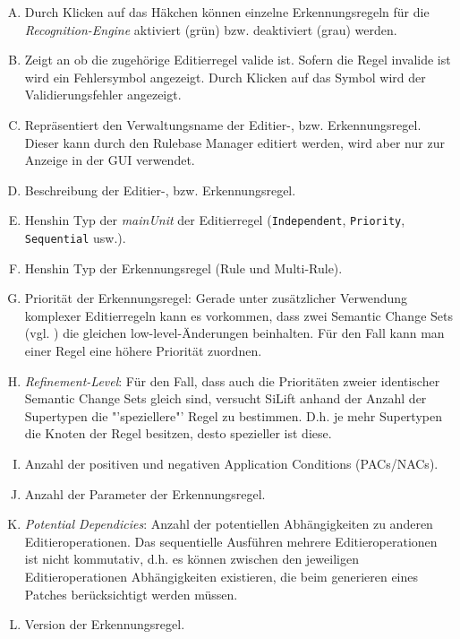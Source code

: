 \begin{enumerate}[(A)]
\item Durch Klicken auf das Häkchen können einzelne Erkennungsregeln für die \textit{Recognition-Engine} aktiviert (grün) bzw. deaktiviert (grau) werden.

\item Zeigt an ob die zugehörige Editierregel valide ist. Sofern die Regel invalide ist wird ein Fehlersymbol angezeigt. Durch Klicken auf das Symbol wird der Validierungsfehler angezeigt.

\item Repräsentiert den Verwaltungsname der Editier-, bzw. Erkennungsregel. Dieser kann durch den Rulebase Manager editiert werden, wird aber nur zur Anzeige in der GUI verwendet.

\item Beschreibung der Editier-, bzw. Erkennungsregel.

\item Henshin Typ der \textit{mainUnit} der Editierregel (\texttt{Independent}, \texttt{Priority}, \texttt{Sequential} usw.).

\item Henshin Typ der Erkennungsregel (Rule und Multi-Rule).

\item Priorität der Erkennungsregel:
 Gerade unter zusätzlicher Verwendung komplexer Editierregeln kann es vorkommen, dass zwei Semantic Change Sets (vgl. \pageref{page:semantic_change_sets}) die gleichen low-level-Änderungen beinhalten. 
Für den Fall kann man einer Regel eine höhere Priorität zuordnen. 

\item \textit{Refinement-Level}: 
Für den Fall, dass auch die Prioritäten zweier identischer Semantic Change Sets gleich sind, versucht SiLift anhand der Anzahl der Supertypen die "'speziellere"' Regel zu bestimmen. 
D.h. je mehr Supertypen die Knoten der Regel besitzen, desto spezieller ist diese. 

\item Anzahl der positiven und negativen Application Conditions (PACs/NACs).

\item Anzahl der Parameter der Erkennungsregel.

\item \textit{Potential Dependicies}: 
Anzahl der potentiellen Abhängigkeiten zu anderen Editieroperationen. 
Das sequentielle Ausführen mehrere Editieroperationen ist nicht kommutativ, d.h. es können zwischen den jeweiligen Editieroperationen Abhängigkeiten existieren, die beim generieren eines Patches berücksichtigt werden müssen. 

\item Version der Erkennungsregel.
\end{enumerate}

